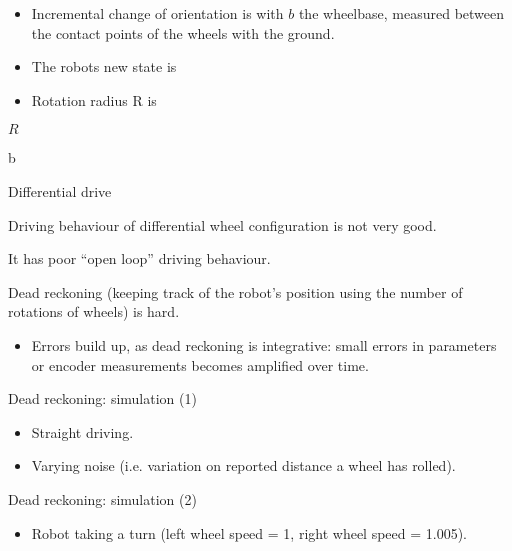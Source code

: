 \documentclass[compress]{beamer}
\begin{document}
\begin{frame}{}

\begin{itemize}
    \item Incremental change of orientation is with $b$ the wheelbase,
  measured between the contact points of the wheels with the ground.
    \item The robots new state is
\end{itemize}

\end{frame}

\begin{frame}{}

\begin{itemize}
    \item Rotation radius R is
\end{itemize}

$R$

b

\end{frame}

\begin{frame}{Differential drive}

Driving behaviour of differential wheel configuration is not very good.

It has poor ``open loop'' driving behaviour.

Dead reckoning (keeping track of the robot's position using the number
of rotations of wheels) is hard.

\begin{itemize}
    \item Errors build up, as dead reckoning is integrative: small errors in
  parameters or encoder measurements becomes amplified over time.
\end{itemize}

\end{frame}

\begin{frame}{Dead reckoning: simulation (1)}

\begin{itemize}
    \item Straight driving.
    \item Varying noise (i.e. variation on reported distance a wheel has
  rolled).
\end{itemize}

\end{frame}

\begin{frame}{Dead reckoning: simulation (2)}

\begin{itemize}
    \item Robot taking a turn (left wheel speed = 1, right wheel speed = 1.005).
\end{itemize}

\end{frame}
\end{document}
